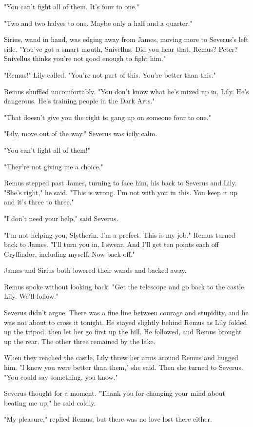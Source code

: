 \documentclass[a4paper,11pt]{article}
\begin{document}
"You can't fight all of them. It's four to one."

"Two and two halves to one. Maybe only a half and a quarter."

Sirius, wand in hand, was edging away from James, moving more to Severus's left side. "You've got a smart mouth, Snivellus. Did you hear that, Remus? Peter? Snivellus thinks you're not good enough to fight him."

"Remus!" Lily called. "You're not part of this. You're better than this."

Remus shuffled uncomfortably. "You don't know what he's mixed up in, Lily. He's dangerous. He's training people in the Dark Arts."

"That doesn't give you the right to gang up on someone four to one."

"Lily, move out of the way." Severus was icily calm.

"You can't fight all of them!"

"They're not giving me a choice."

Remus stepped past James, turning to face him, his back to Severus and Lily. "She's right," he said. "This is wrong. I'm not with you in this. You keep it up and it's three to three."

"I don't need your help," said Severus.

"I'm not helping you, Slytherin. I'm a prefect. This is my job." Remus turned back to James. "I'll turn you in, I swear. And I'll get ten points each off Gryffindor, including myself. Now back off."

James and Sirius both lowered their wands and backed away.

Remus spoke without looking back. "Get the telescope and go back to the castle, Lily. We'll follow."

Severus didn't argue. There was a fine line between courage and stupidity, and he was not about to cross it tonight. He stayed slightly behind Remus as Lily folded up the tripod, then let her go first up the hill. He followed, and Remus brought up the rear. The other three remained by the lake.

When they reached the castle, Lily threw her arms around Remus and hugged him. "I knew you were better than them," she said. Then she turned to Severus. "You could say something, you know."

Severus thought for a moment. "Thank you for changing your mind about beating me up," he said coldly.

"My pleasure," replied Remus, but there was no love lost there either.
\end{document}
